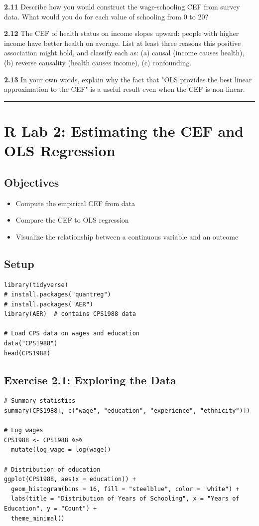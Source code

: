 \textbf{2.11} Describe how you would construct the wage-schooling CEF from survey data. What would you do for each value of schooling from 0 to 20?

\textbf{2.12} The CEF of health status on income slopes upward: people with higher income have better health on average. List at least three reasons this positive association might hold, and classify each as: (a) causal (income causes health), (b) reverse causality (health causes income), (c) confounding.

\textbf{2.13} In your own words, explain why the fact that "OLS provides the best linear approximation to the CEF" is a useful result even when the CEF is non-linear.

\medskip\hrule\medskip

\section{R Lab 2: Estimating the CEF and OLS Regression}

\subsection{Objectives}
\begin{itemize}
\item Compute the empirical CEF from data
\item Compare the CEF to OLS regression
\item Visualize the relationship between a continuous variable and an outcome
\end{itemize}

\subsection{Setup}

\begin{lstlisting}
library(tidyverse)
# install.packages("quantreg")
# install.packages("AER")
library(AER)  # contains CPS1988 data

# Load CPS data on wages and education
data("CPS1988")
head(CPS1988)
\end{lstlisting}

\subsection{Exercise 2.1: Exploring the Data}

\begin{lstlisting}
# Summary statistics
summary(CPS1988[, c("wage", "education", "experience", "ethnicity")])

# Log wages
CPS1988 <- CPS1988 %>%
  mutate(log_wage = log(wage))

# Distribution of education
ggplot(CPS1988, aes(x = education)) +
  geom_histogram(bins = 16, fill = "steelblue", color = "white") +
  labs(title = "Distribution of Years of Schooling", x = "Years of Education", y = "Count") +
  theme_minimal()
\end{lstlisting}

